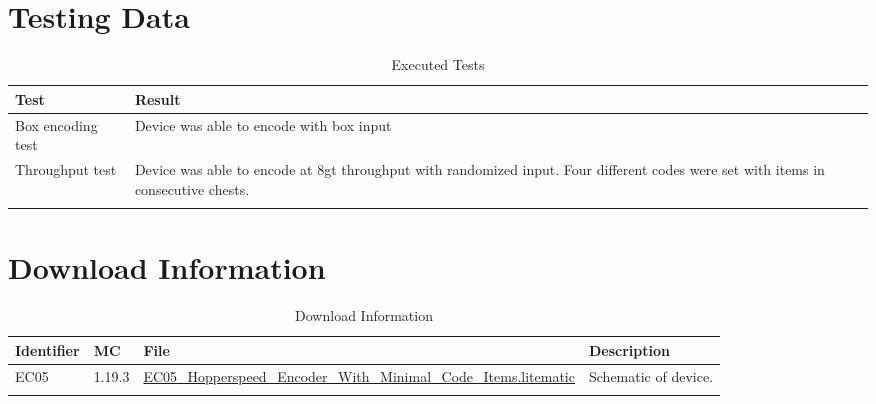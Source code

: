 \documentclass[10pt]{datasheet}
\begin{document}
\section{Testing Data}
\begin{table}[h]
\caption{Executed Tests}
\begin{tabularx}{\textwidth}{l | X}
    \thickhline
    \textbf{Test} & \textbf{Result} \\
    \hline
    Box encoding test & Device was able to encode with box input \\
    \hline
    Throughput test & Device was able to encode at 8gt throughput with randomized input. Four different codes were set with items in consecutive chests. \\
    \thickhline
\end{tabularx}
\end{table}

\section{Download Information}
\begin{table}[h]
    \caption{Download Information}
    \begin{tabularx}{\textwidth}{l | l | l | X}
        \thickhline
        \textbf{Identifier} & \textbf{MC} & \textbf{File} & \textbf{Description} \\
        \hline
        EC05 & 1.19.3 & \href{https://github.com/Soontech-Annals/Archive/blob/63c9ea8c34519ca4eb58649773e0c37e7e462fdd/Archive/encoders/EC05\%20Hopperspeed\%20Encoder\%20With\%20Minimal\%20Code\%20Items/EC05\_Hopperspeed\_Encoder\_With\_Minimal\_Code\_Items.litematic?raw=1}{EC05\_Hopperspeed\_Encoder\_With\_Minimal\_Code\_Items.litematic} & Schematic of device. \\
        \hline
        \thickhline
    \end{tabularx}
\end{table}
\end{document}
